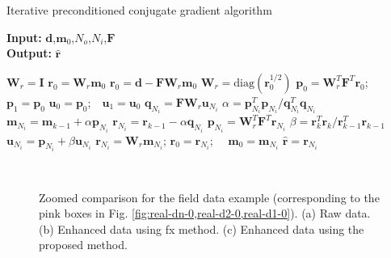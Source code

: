 \begin{algorithm}
   \caption{Iterative preconditioned conjugate gradient algorithm}
   \textbf{Input:} $\mathbf{d}$,$\mathbf{m}_0$,$N_o$,$N_i$,$\mathbf{F}$ \\
   \textbf{Output:} $\hat{\mathbf{r}}$ 
    \begin{algorithmic}[1]
    \State $\mathbf{W}_r=\mathbf{I}$
    \State $\mathbf{r}_0=\mathbf{W}_r\mathbf{m}_0$ 
    \State $\mathbf{r}_0=\mathbf{d}-\mathbf{F}\mathbf{W}_r\mathbf{m}_0$
    \State $\mathbf{W}_r=\text{diag}(\mathbf{r}_0^{1/2})$
    \State $\mathbf{p}_0=\mathbf{W}_r^T\mathbf{F}^T\mathbf{r}_0$;$\quad$$\mathbf{p}_1=\mathbf{p}_0$ 
    \State $\mathbf{u}_0=\mathbf{p}_0$;$\quad$$\mathbf{u}_1=\mathbf{u}_0$ 
    \State $\mathbf{q}_{N_i}=\mathbf{F}\mathbf{W}_r\mathbf{u}_{N_i}$
    \State $\alpha=\mathbf{p}_{N_i}^T\mathbf{p}_{N_i}/\mathbf{q}_{N_i}^T\mathbf{q}_{N_i}$
    \State $\mathbf{m}_{N_i}=\mathbf{m}_{k-1}+\alpha\mathbf{p}_{N_i}$
    \State $\mathbf{r}_{N_i}=\mathbf{r}_{k-1}-\alpha\mathbf{q}_{N_i}$ 
    \State $\mathbf{p}_{N_i}=\mathbf{W}_r^T\mathbf{F}^T\mathbf{r}_{N_i}$
    \State $\beta=\mathbf{r}^T_{k}\mathbf{r}_{k}/\mathbf{r}^T_{k-1}\mathbf{r}_{k-1}$ 
    \State $\mathbf{u}_{N_i}=\mathbf{p}_{N_i}+\beta\mathbf{u}_{N_i}$
    \EndFor
    \State $\mathbf{r}_{N_i}=\mathbf{W}_r\mathbf{m}_{N_i}$;
    \State $\mathbf{r}_0=\mathbf{r}_{N_i}$;$\quad$ $\mathbf{m}_0=\mathbf{m}_{N_i}$
    \EndFor
    \State $\hat{\mathbf{r}}=\mathbf{r}_{N_i}$ 
\end{algorithmic}
\label{alg:alg1}
\end{algorithm}


\begin{figure}[htb!]
 \centering
 \\
  \caption{Zoomed comparison for the field data example (corresponding to the pink boxes in Fig. \ref{fig:real-dn-0,real-d2-0,real-d1-0}). (a) Raw data. (b) Enhanced data using fx method. (c) Enhanced data using the proposed method.}
  \label{fig:real-dn-z1,real-d2-z1,real-d1-z1}
\end{figure}


